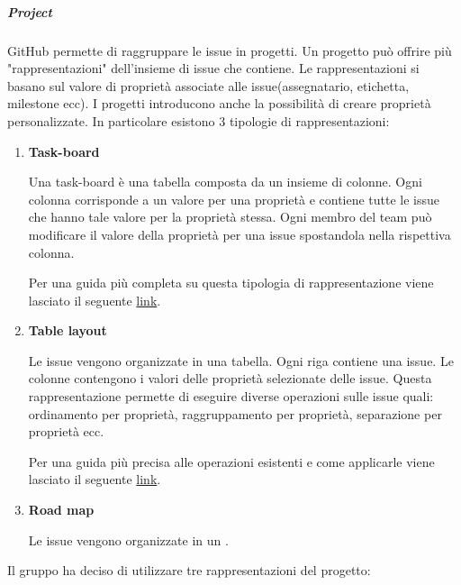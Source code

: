 \subparagraph{Project}
\label{subpar:project}
GitHub permette di raggruppare le issue in progetti.
Un progetto può offrire più "rappresentazioni" dell'insieme di issue che contiene.
Le rappresentazioni si basano sul valore di proprietà associate alle issue(assegnatario, etichetta, milestone ecc).
I progetti introducono anche la possibilità di creare proprietà personalizzate.
In particolare esistono 3 tipologie di rappresentazioni:
\begin{enumerate}
    \item \textbf{Task-board}
    
    Una task-board è una tabella composta da un insieme di colonne.
    Ogni colonna corrisponde a un valore per una proprietà e contiene tutte le issue che hanno tale valore per la proprietà stessa.
    Ogni membro del team può modificare il valore della proprietà per una issue spostandola nella rispettiva colonna.

    Per una guida più completa su questa tipologia di rappresentazione viene lasciato il seguente \href{https://docs.github.com/en/issues/planning-and-tracking-with-projects/customizing-views-in-your-project/customizing-the-board-layout}{link}.

    \item \textbf{Table layout}
    
    Le issue vengono organizzate in una tabella.
    Ogni riga contiene una issue.
    Le colonne contengono i valori delle proprietà selezionate delle issue. 
    Questa rappresentazione permette di eseguire diverse operazioni sulle issue quali: ordinamento per proprietà, raggruppamento per proprietà, separazione per proprietà ecc.
    
    Per una guida più precisa alle operazioni esistenti e come applicarle viene lasciato il seguente \href{https://docs.github.com/en/issues/planning-and-tracking-with-projects/customizing-views-in-your-project/customizing-the-table-layout}{link}.

    \item \textbf{Road map}
    
    Le issue vengono organizzate in un .
\end{enumerate}
Il gruppo ha deciso di utilizzare tre rappresentazioni del progetto:
